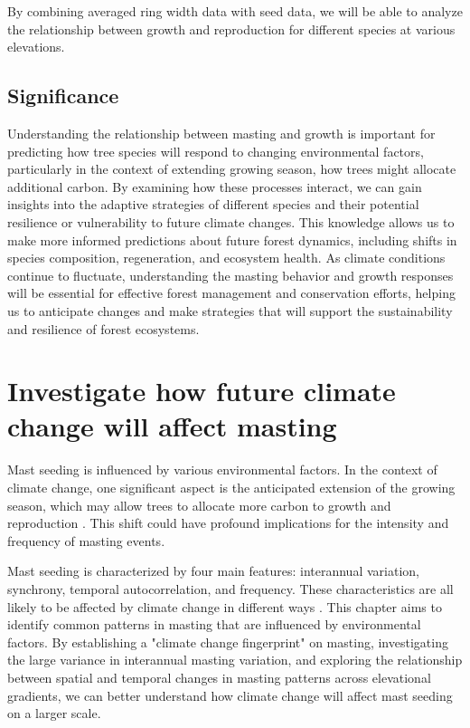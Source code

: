 \documentclass[11pt,letter]{article}
\begin{document}
By combining averaged ring width data with seed data, we will be able to analyze the relationship between growth and reproduction for different species at various elevations.

\subsection{Significance}
Understanding the relationship between masting and growth is important for predicting how tree species will respond to changing environmental factors, particularly in the context of extending growing season, how trees might allocate additional carbon. By examining how these processes interact, we can gain insights into the adaptive strategies of different species and their potential resilience or vulnerability to future climate changes. This knowledge allows us to make more informed predictions about future forest dynamics, including shifts in species composition, regeneration, and ecosystem health. As climate conditions continue to fluctuate, understanding the  masting behavior and growth responses will be essential for effective forest management and conservation efforts, helping us to anticipate changes and make strategies that will support the sustainability and resilience of forest ecosystems.

\section{Investigate how future climate change will affect masting}
Mast seeding is influenced by various environmental factors. In the context of climate change, one significant aspect is the anticipated extension of the growing season, which may allow trees to allocate more carbon to growth and reproduction \citep{keenan2014net}. This shift could have profound implications for the intensity and frequency of masting events.

Mast seeding is characterized by four main features: interannual variation, synchrony, temporal autocorrelation, and frequency. These characteristics are all likely to be affected by climate change in different ways \citep{hacket2021climate}. This chapter aims to identify common patterns in masting that are influenced by environmental factors. By establishing a "climate change fingerprint" on masting, investigating the large variance in interannual masting variation, and exploring the relationship between spatial and temporal changes in masting patterns across elevational gradients, we can better understand how climate change will affect mast seeding on a larger scale.
\end{document}
